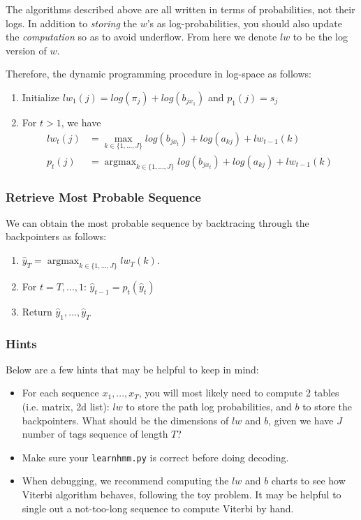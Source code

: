 \documentclass{article}
\newcommand{\argmax}{\mathop{\mathrm{argmax}}}
\begin{document}
The algorithms described above are all written in terms of probabilities, not their logs. In addition to \emph{storing} the $w$'s as log-probabilities, you should also update the \emph{computation} so as to avoid underflow. From here we denote $lw$ to be the log version of $w$.

Therefore, the dynamic programming procedure in log-space as follows: 
\begin{enumerate}
    \item Initialize $lw_1(j) = log(\pi_j) + log(b_{jx_1})$ and $p_1(j) = s_j$
    \item For $t > 1$, we have 
    \begin{align*}
        lw_t(j) &= \max_{k \in \{1,...,J\}} log(b_{jx_t}) + log(a_{kj}) + lw_{t-1}(k) \\ 
        p_t(j) &= \argmax_{k \in \{1,...,J\}} log(b_{jx_t}) + log(a_{kj}) + lw_{t-1}(k)
    \end{align*}
\end{enumerate}

\subsubsection{Retrieve Most Probable Sequence}
We can obtain the most probable sequence by backtracing through the backpointers as follows:
\begin{enumerate}
    \item $\hat{y}_T = \argmax_{k \in \{1,...,J\}} lw_T(k)$.
    \item For $t = T,...,1$: $\hat{y}_{t-1} = p_t(\hat{y}_t)$
    \item Return $\hat{y}_1, ..., \hat{y}_T$
\end{enumerate}

\subsubsection{Hints}
Below are a few hints that may be helpful to keep in mind:
\begin{itemize}
    \item For each sequence $x_1, ..., x_T$, you will most likely need to compute 2 tables (i.e. matrix, 2d list): $lw$ to store the path log probabilities, and $b$ to store the backpointers. What should be the dimensions of $lw$ and $b$, given we have $J$ number of tags sequence of length $T$?
    \item Make sure your \texttt{learnhmm.py} is correct before doing decoding. 
    \item When debugging, we recommend computing the $lw$ and $b$ charts to see how Viterbi algorithm behaves, following the toy problem. It may be helpful to single out a not-too-long sequence to compute Viterbi by hand.
\end{itemize}
\end{document}
